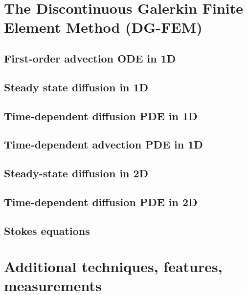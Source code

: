 \documentclass[a4paper]{article}
\begin{document}
\newpage
\section{The Discontinuous Galerkin Finite Element Method (DG-FEM) \label{dgfem}} %



\subsection{First-order advection ODE in 1D} 
\subsection{Steady state diffusion in 1D \label{ss:dgss1D}} 
\subsection{Time-dependent diffusion PDE in 1D} 

\newpage
\subsection{Time-dependent advection PDE in 1D \label{ss:dgfem1D_adv}}  %

\newpage
\subsection{Steady-state diffusion in 2D} 
\subsection{Time-dependent diffusion PDE in 2D}

\newpage
\subsection{Stokes equations} 



\newpage
\section{Additional techniques, features, measurements} %
\end{document}
